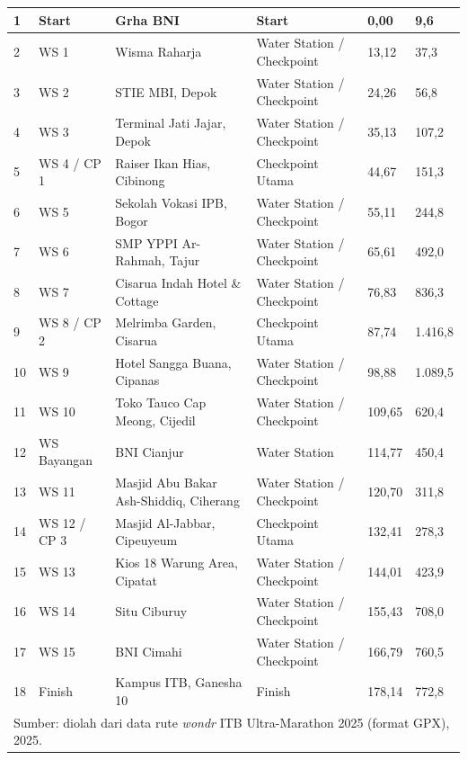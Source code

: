 \begin{longtable}{|p{0.6cm}|p{1.6cm}|p{3.6cm}|p{2.6cm}|p{1.7cm}|p{1.6cm}|}
1  & Start        & Grha BNI                                & Start                      & 0,00   & 9,6 \\ \hline
2  & WS 1         & Wisma Raharja                           & Water Station / Checkpoint & 13,12  & 37,3 \\ \hline
3  & WS 2         & STIE MBI, Depok                         & Water Station / Checkpoint & 24,26  & 56,8 \\ \hline
4  & WS 3         & Terminal Jati Jajar, Depok              & Water Station / Checkpoint & 35,13  & 107,2 \\ \hline
5  & WS 4 / CP 1  & Raiser Ikan Hias, Cibinong              & Checkpoint Utama           & 44,67  & 151,3 \\ \hline
6  & WS 5         & Sekolah Vokasi IPB, Bogor               & Water Station / Checkpoint & 55,11  & 244,8 \\ \hline
7  & WS 6         & SMP YPPI Ar-Rahmah, Tajur               & Water Station / Checkpoint & 65,61  & 492,0 \\ \hline
8  & WS 7         & Cisarua Indah Hotel \& Cottage          & Water Station / Checkpoint & 76,83  & 836,3 \\ \hline
9  & WS 8 / CP 2  & Melrimba Garden, Cisarua                & Checkpoint Utama           & 87,74  & 1.416,8 \\ \hline
10 & WS 9         & Hotel Sangga Buana, Cipanas             & Water Station / Checkpoint & 98,88  & 1.089,5 \\ \hline
11 & WS 10        & Toko Tauco Cap Meong, Cijedil           & Water Station / Checkpoint & 109,65 & 620,4 \\ \hline
12 & WS Bayangan  & BNI Cianjur                              & Water Station              & 114,77 & 450,4 \\ \hline
13 & WS 11        & Masjid Abu Bakar Ash-Shiddiq, Ciherang  & Water Station / Checkpoint & 120,70 & 311,8 \\ \hline
14 & WS 12 / CP 3 & Masjid Al-Jabbar, Cipeuyeum             & Checkpoint Utama           & 132,41 & 278,3 \\ \hline
15 & WS 13        & Kios 18 Warung Area, Cipatat            & Water Station / Checkpoint & 144,01 & 423,9 \\ \hline
16 & WS 14        & Situ Ciburuy                             & Water Station / Checkpoint & 155,43 & 708,0 \\ \hline
17 & WS 15        & BNI Cimahi                               & Water Station / Checkpoint & 166,79 & 760,5 \\ \hline
18 & Finish       & Kampus ITB, Ganesha 10                  & Finish                      & 178,14 & 772,8 \\ \hline
 
\multicolumn{6}{l}{\footnotesize Sumber: diolah dari data rute \textit{wondr} ITB Ultra-Marathon 2025 (format GPX), 2025.}
\end{longtable}
\endgroup